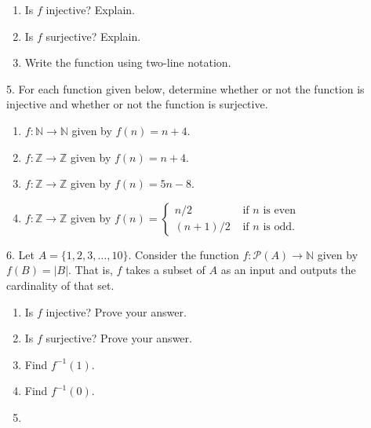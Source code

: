 \documentclass[10pt,]{book}
\theoremstyle{plain}
\theoremstyle{definition}
\theoremstyle{definition}
\theoremstyle{definition}
\numberwithin{equation}{chapter}
\def\N{\mathbb N}
\def\Z{\mathbb Z}
\def\pow{\mathcal P}
\def\inv{^{-1}}
\newcommand{\amp}{&}
\begin{document}
\begin{exerciselist}
\hypertarget{p-2185}{}%
\leavevmode%
\begin{enumerate}[label=(\alph*)]
\item\hypertarget{li-402}{}\hypertarget{p-2186}{}%
Is \(f\) injective? Explain.%
\item\hypertarget{li-403}{}\hypertarget{p-2187}{}%
Is \(f\) surjective? Explain.%
\item\hypertarget{li-404}{}\hypertarget{p-2188}{}%
Write the function using two-line notation.%
\end{enumerate}
%
\par\smallskip
\item[5.]\hypertarget{exercise-86}{}\hypertarget{p-2193}{}%
For each function given below, determine whether or not the function is injective and whether or not the function is surjective. \leavevmode%
\begin{enumerate}[label=(\alph*)]
\item\hypertarget{li-408}{}\(f:\N \to \N\) given by \(f(n) = n+4\).%
\item\hypertarget{li-409}{}\(f:\Z \to \Z\) given by \(f(n) = n+4\).%
\item\hypertarget{li-410}{}\(f:\Z \to \Z\) given by \(f(n) = 5n - 8\).%
\item\hypertarget{li-411}{}\(f:\Z \to \Z\) given by \(f(n) = \begin{cases}n/2 \amp  \text{ if } n \text{ is even} \\ (n+1)/2 \amp \text{ if } n \text{ is odd} . \end{cases}\)%
\end{enumerate}
%
\par\smallskip
\item[6.]\hypertarget{exercise-87}{}\hypertarget{p-2195}{}%
Let \(A = \{1,2,3,\ldots,10\}\). Consider the function \(f:\pow(A) \to \N\) given by \(f(B) = |B|\). That is, \(f\) takes a subset of \(A\) as an input and outputs the cardinality of that set. \leavevmode%
\begin{enumerate}[label=(\alph*)]
\item\hypertarget{li-416}{}\hypertarget{p-2196}{}%
Is \(f\) injective? Prove your answer.%
\item\hypertarget{li-417}{}\hypertarget{p-2197}{}%
Is \(f\) surjective? Prove your answer.%
\item\hypertarget{li-418}{}\hypertarget{p-2198}{}%
Find \(f\inv(1)\).%
\item\hypertarget{li-419}{}\hypertarget{p-2199}{}%
Find \(f\inv(0)\).%
\item\hypertarget{li-420}{}\hypertarget{p-2200}{}%

\end{enumerate}
\end{exerciselist}
\end{document}
